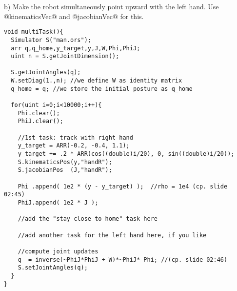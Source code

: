 b) Make the robot simultaneously point upward with the left hand. Use 
@kinematicsVec@ and @jacobianVec@ for this.

\newpage

\begin{code}\begin{verbatim}
void multiTask(){
  Simulator S("man.ors");
  arr q,q_home,y_target,y,J,W,Phi,PhiJ;
  uint n = S.getJointDimension();

  S.getJointAngles(q);
  W.setDiag(1.,n); //we define W as identity matrix
  q_home = q; //we store the initial posture as q_home

  for(uint i=0;i<10000;i++){
    Phi.clear();
    PhiJ.clear();

    //1st task: track with right hand
    y_target = ARR(-0.2, -0.4, 1.1); 
    y_target += .2 * ARR(cos((double)i/20), 0, sin((double)i/20)); 
    S.kinematicsPos(y,"handR");
    S.jacobianPos  (J,"handR");

    Phi .append( 1e2 * (y - y_target) );  //rho = 1e4 (cp. slide 02:45)
    PhiJ.append( 1e2 * J );

    //add the "stay close to home" task here
    
    //add another task for the left hand here, if you like

    //compute joint updates
    q -= inverse(~PhiJ*PhiJ + W)*~PhiJ* Phi; //(cp. slide 02:46)
    S.setJointAngles(q);
  }
}
\end{verbatim}\end{code}








